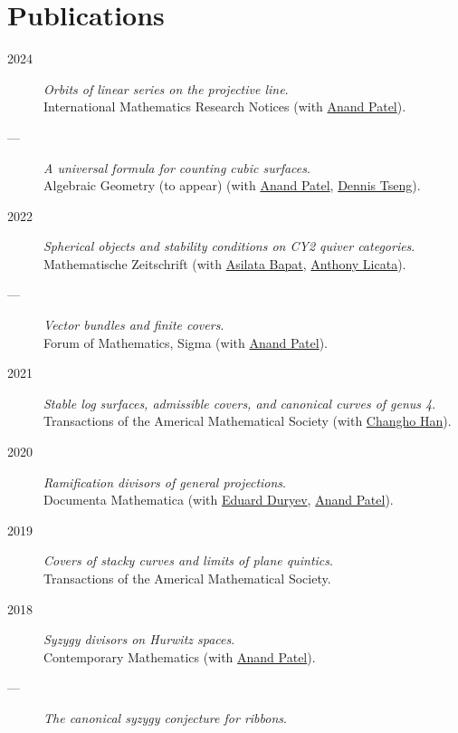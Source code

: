 \documentclass[11pt]{article}
\begin{document}
\section*{Publications}
\label{sec:org916c057}
\label{orgcb20595}
\begin{description}
\item[{2024}] \emph{Orbits of linear series on the projective line}.\\
International Mathematics Research Notices (with \href{https://sites.google.com/view/anand-patel}{Anand Patel}).
\item[{---}] \emph{A universal formula for counting cubic surfaces}.\\
Algebraic Geometry (to appear) (with \href{https://sites.google.com/view/anand-patel}{Anand Patel}, \href{https://sites.google.com/view/dennis-tseng}{Dennis Tseng}).
\item[{2022}] \emph{Spherical objects and stability conditions on CY2 quiver categories}.\\
Mathematische Zeitschrift (with \href{https://asilata.org/}{Asilata Bapat}, \href{https://maths-people.anu.edu.au/\~licatat/}{Anthony Licata}).
\item[{---}] \emph{Vector bundles and finite covers}.\\
Forum of Mathematics, Sigma (with \href{https://sites.google.com/view/anand-patel}{Anand Patel}).
\item[{2021}] \emph{Stable log surfaces, admissible covers, and canonical curves of genus 4}.\\
Transactions of the Americal Mathematical Society (with \href{https://sites.google.com/view/changho-han/}{Changho Han}).
\item[{2020}] \emph{Ramification divisors of general projections}.\\
Documenta Mathematica (with \href{https://eduryev.weebly.com/}{Eduard Duryev}, \href{https://sites.google.com/view/anand-patel}{Anand Patel}).
\item[{2019}] \emph{Covers of stacky curves and limits of plane quintics}.\\
Transactions of the Americal Mathematical Society.
\item[{2018}] \emph{Syzygy divisors on Hurwitz spaces}.\\
Contemporary Mathematics (with \href{https://sites.google.com/view/anand-patel}{Anand Patel}).
\item[{---}] \emph{The canonical syzygy conjecture for ribbons}.\\

\end{description}
\end{document}

